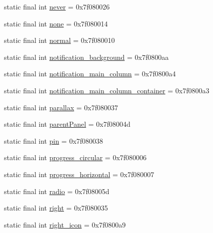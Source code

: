 \begin{CompactItemize}
static final int \hyperlink{classandroid_1_1support_1_1transition_1_1_r_1_1id_be698fa264a9258c067fa0b5867ae248}{never} = 0x7f080026
\item 
static final int \hyperlink{classandroid_1_1support_1_1transition_1_1_r_1_1id_50d06d7ab3254b67011c0a857c2fe4a2}{none} = 0x7f080014
\item 
static final int \hyperlink{classandroid_1_1support_1_1transition_1_1_r_1_1id_c76a4d47887013a61c7d90160bac04c0}{normal} = 0x7f080010
\item 
static final int \hyperlink{classandroid_1_1support_1_1transition_1_1_r_1_1id_0036e0872ccd88b11df30de6b83fa13e}{notification\_\-background} = 0x7f0800aa
\item 
static final int \hyperlink{classandroid_1_1support_1_1transition_1_1_r_1_1id_f3466bcb2fb0d030e039e475b76c1ce2}{notification\_\-main\_\-column} = 0x7f0800a4
\item 
static final int \hyperlink{classandroid_1_1support_1_1transition_1_1_r_1_1id_dad2d42283e496435ec8259e4632269f}{notification\_\-main\_\-column\_\-container} = 0x7f0800a3
\item 
static final int \hyperlink{classandroid_1_1support_1_1transition_1_1_r_1_1id_bc29cb85fd366e24d9e16c6bc5f5cda6}{parallax} = 0x7f080037
\item 
static final int \hyperlink{classandroid_1_1support_1_1transition_1_1_r_1_1id_f9a30c732b37d17e6c7af084d8ee21e4}{parentPanel} = 0x7f08004d
\item 
static final int \hyperlink{classandroid_1_1support_1_1transition_1_1_r_1_1id_2c389d8115fb2e81f384f6c0e215a8e6}{pin} = 0x7f080038
\item 
static final int \hyperlink{classandroid_1_1support_1_1transition_1_1_r_1_1id_21fbb12e59217fdbc6d181345bc83f5f}{progress\_\-circular} = 0x7f080006
\item 
static final int \hyperlink{classandroid_1_1support_1_1transition_1_1_r_1_1id_9ea4cf4fed8898b0dc953ca52dbf6764}{progress\_\-horizontal} = 0x7f080007
\item 
static final int \hyperlink{classandroid_1_1support_1_1transition_1_1_r_1_1id_962304a380fc12b95adab6b012e5e580}{radio} = 0x7f08005d
\item 
static final int \hyperlink{classandroid_1_1support_1_1transition_1_1_r_1_1id_df25f33170451fc61b83a2e60515d9e7}{right} = 0x7f080035
\item 
static final int \hyperlink{classandroid_1_1support_1_1transition_1_1_r_1_1id_fc96b4960e54db9fb6a5d97c0cb3d0c5}{right\_\-icon} = 0x7f0800a9
\item 

\end{CompactItemize}
